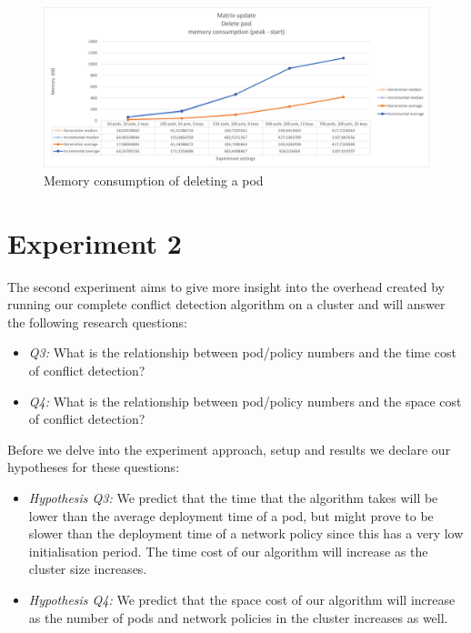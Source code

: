 \begin{figure}[H]
    \centering
    \includegraphics[width=\textwidth]{images/experiment1/delPod-memory.png}
    \caption{Memory consumption of deleting a pod}
    \label{fig:exp1-delPod-memory}
\end{figure}



\section{Experiment 2}\label{sec:experiment2}
The second experiment aims to give more insight into the overhead created by running our complete conflict detection algorithm on a cluster and will answer the following research questions:

\begin{itemize}
    \item \textit{Q3:} What is the relationship between pod/policy numbers and the time cost of conflict detection?
    \item \textit{Q4:} What is the relationship between pod/policy numbers and the space cost of conflict detection?
\end{itemize}

Before we delve into the experiment approach, setup and results we declare our hypotheses for these questions:

\begin{itemize}
    \item \textit{Hypothesis Q3:} We predict that the time that the algorithm takes will be lower than the average deployment time of a pod, but might prove to be slower than the deployment time of a network policy since this has a very low initialisation period. The time cost of our algorithm will increase as the cluster size increases.
    \item \textit{Hypothesis Q4:} We predict that the space cost of our algorithm will increase as the number of pods and network policies in the cluster increases as well.
\end{itemize}

